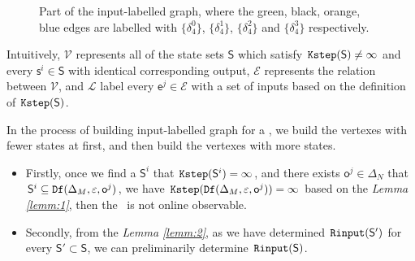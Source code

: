 \begin{figure}[thpb]
      \centering
      \caption{Part of the input-labelled graph, where the green, black, orange, blue edges are labelled with $\{\delta_4^0\}$, $\{\delta_4^1\}$, $\{\delta_4^2\}$ and $\{\delta_4^3\}$ respectively.}
      \label{fig:4}
\end{figure}

Intuitively, $\mathcal{V}$ represents all of the state sets $\mathsf{S}$ which satisfy ${\tt Kstep}(\mathsf{S})\ne \infty$ and every $\mathsf{s}^i\in\mathsf{S}$ with identical corresponding output, $\mathcal{E}$ represents the relation between $\mathcal{V}$, and $\mathcal{L}$ label every $\mathsf{e}^j \in\mathcal{E}$ with a set of inputs based on the definition of ${\tt Kstep}(\mathsf{S})$. %


In the process of building input-labelled graph for a \BCN, we build the vertexes with fewer states at first, and then build the vertexes with more states.
\begin{itemize}
\item  Firstly, once we find a $\mathsf{S}^i$ that ${\tt Kstep}(\mathsf{S}^i)= \infty$, and there exists $\mathsf{o}^{j}\in \Delta_N$ that $\mathsf{S}^{i}\subseteq {\tt Df}(\Delta_M,\varepsilon, \mathsf{o}^{j})$, we have ${\tt Kstep}({\tt Df}(\Delta_M,\varepsilon, \mathsf{o}^{j}))= \infty$ based on the {\em Lemma \ref{lemm:1}}, then the \BCN\ is not online observable.
\item  Secondly, from the {\em Lemma \ref{lemm:2}}, as we have determined ${\tt Rinput}(\mathsf{S}')$ for every $\mathsf{S}'\subset\mathsf{S}$, we can preliminarily determine ${\tt Rinput}(\mathsf{S})$.
 \end{itemize}
